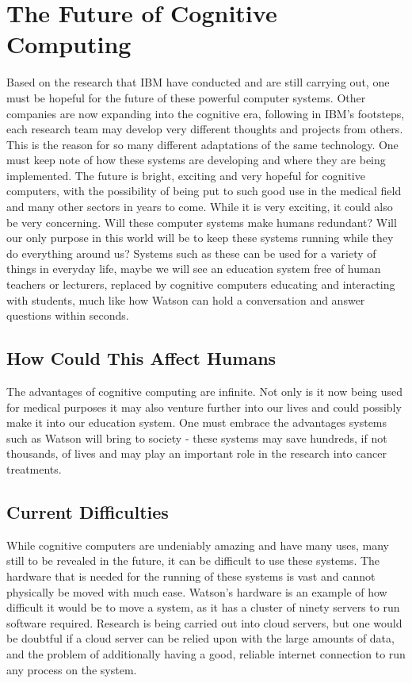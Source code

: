 \documentclass[journal]{IEEEtran}
\begin{document}
\section{The Future of Cognitive Computing}
Based on the research that IBM have conducted and are still carrying out, one must be hopeful for the future of these powerful computer systems. Other companies are now expanding into the cognitive era, following in IBM's footsteps, each research team may develop very different thoughts and projects from others\cite{hp}. This is the reason for so many different adaptations of the same technology. One must keep note of how these systems are developing and where they are being implemented. The future is bright, exciting and very hopeful for cognitive computers, with the possibility of being put to such good use in the medical field and many other sectors in years to come. While it is very exciting, it could also be very concerning. Will these computer systems make humans redundant? Will our only purpose in this world will be to keep these systems running while they do everything around us? Systems such as these can be used for a variety of things in everyday life, maybe we will see an education system free of human teachers or lecturers, replaced by cognitive computers educating and interacting with students, much like how Watson can hold a conversation and answer questions within seconds.

\subsection{How Could This Affect Humans}
The advantages of cognitive computing are infinite. Not only is it now being used for medical purposes it may also venture further into our lives and could possibly make it into our education system\cite{education}. One must embrace the advantages systems such as Watson will bring to society - these systems may save hundreds, if not thousands, of lives and may play an important role in the research into cancer treatments. 

\subsection{Current Difficulties}
While cognitive computers are undeniably amazing and have many uses, many still to be revealed in the future, it can be difficult to use these systems. The hardware that is needed for the running of these systems is vast and cannot physically be moved with much ease. Watson's hardware is an example of how difficult it would be to move a system, as it has a cluster of ninety servers to run software required\cite{power}. Research is being carried out into cloud servers, but one would be doubtful if a cloud server can be relied upon with the large amounts of data, and the problem of additionally having a good, reliable internet connection to run any process on the system.
\end{document}
